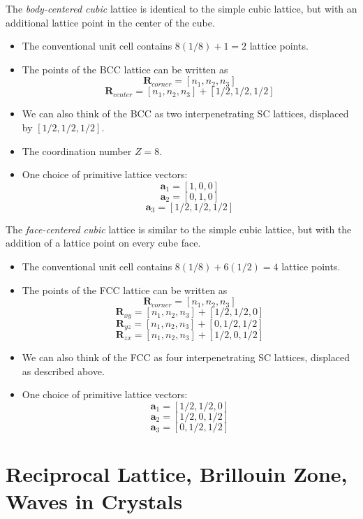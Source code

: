 \documentclass[10pt]{article}
\begin{document}
The \emph{body-centered cubic} lattice is identical to the simple cubic lattice, but with an additional
lattice point in the center of the cube.
\begin{itemize}
  \item The conventional unit cell contains $8(1/8) + 1 = 2$ lattice points.
  \item The points of the BCC lattice can be written as
  $$\textbf{R}_{corner} = [n_{1}, n_{2}, n_{3}]$$
  $$\textbf{R}_{center} = [n_{1}, n_{2}, n_{3}] + [1/2, 1/2, 1/2]$$
  \item We can also think of the BCC as two interpenetrating SC lattices, displaced by $[1/2, 1/2, 1/2]$.
  \item The coordination number $Z = 8$.
  \item One choice of primitive lattice vectors:
  $$\textbf{a}_{1} = [1, 0, 0]$$
  $$\textbf{a}_{2} = [0, 1, 0]$$
  $$\textbf{a}_{3} = [1/2, 1/2, 1/2]$$

\end{itemize}

The \emph{face-centered cubic} lattice is similar to the simple cubic lattice, but with the addition of a
lattice point on every cube face.
\begin{itemize}
\item The conventional unit cell contains $8(1/8) + 6(1/2) = 4$ lattice points.
\item The points of the FCC lattice can be written as
$$\textbf{R}_{corner} = [n_{1}, n_{2}, n_{3}]$$
$$\textbf{R}_{xy} = [n_{1}, n_{2}, n_{3}] + [1/2, 1/2, 0]$$
$$\textbf{R}_{yz} = [n_{1}, n_{2}, n_{3}] + [0, 1/2, 1/2]$$
$$\textbf{R}_{zx} = [n_{1}, n_{2}, n_{3}] + [1/2, 0, 1/2]$$
\item We can also think of the FCC as four interpenetrating SC lattices, displaced as described above.
\item One choice of primitive lattice vectors:
$$\textbf{a}_{1} = [1/2, 1/2, 0]$$
$$\textbf{a}_{2} = [1/2, 0, 1/2]$$
$$\textbf{a}_{3} = [0, 1/2, 1/2]$$
\end{itemize}

\section{Reciprocal Lattice, Brillouin Zone, Waves in Crystals}
\end{document}
